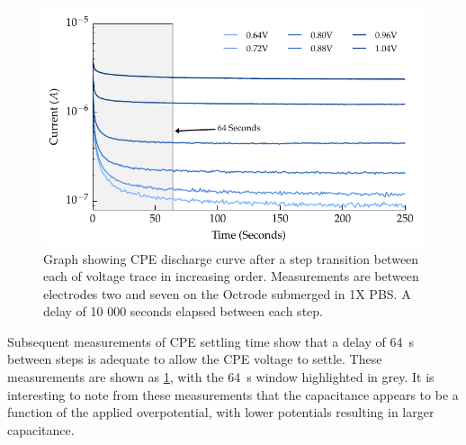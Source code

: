         \begin{figure}
          \centering
          \includegraphics{content/pt2/08-InterfaceParameters/graphics/graph_CPE_currentVsTime_thesis}
          \caption{\label{fig:graph_CPE_currentVsTime}Graph showing CPE discharge curve after a step transition between each of voltage trace in increasing order. Measurements are between electrodes two and seven on the Octrode submerged in 1X PBS. A delay of 10 000 seconds elapsed between each step.}
        \end{figure}
        Subsequent measurements of CPE settling time show that a delay of \SI{64}{\second} between steps is adequate to allow the CPE voltage to settle.
        These measurements are shown as \cref{fig:graph_CPE_currentVsTime}, with the \SI{64}{\second} window highlighted in grey.
        It is interesting to note from these measurements that the capacitance appears to be a function of the applied overpotential, with lower potentials resulting in larger capacitance.


